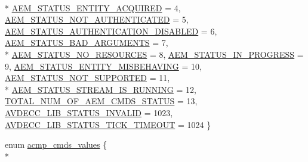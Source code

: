 \begin{DoxyCompactItemize}
\\*
\hyperlink{namespaceavdecc__lib_affd436edb2cecd20cfd784a84f852b2bac29adbeb4681b7134713cb3339b25deb}{A\+E\+M\+\_\+\+S\+T\+A\+T\+U\+S\+\_\+\+E\+N\+T\+I\+T\+Y\+\_\+\+A\+C\+Q\+U\+I\+R\+ED} = 4, 
\hyperlink{namespaceavdecc__lib_affd436edb2cecd20cfd784a84f852b2baf7adc1da1d42de8b7dd6948c4f0007ea}{A\+E\+M\+\_\+\+S\+T\+A\+T\+U\+S\+\_\+\+N\+O\+T\+\_\+\+A\+U\+T\+H\+E\+N\+T\+I\+C\+A\+T\+ED} = 5, 
\hyperlink{namespaceavdecc__lib_affd436edb2cecd20cfd784a84f852b2ba340db3afdf0c9c2c6967240fd303b25f}{A\+E\+M\+\_\+\+S\+T\+A\+T\+U\+S\+\_\+\+A\+U\+T\+H\+E\+N\+T\+I\+C\+A\+T\+I\+O\+N\+\_\+\+D\+I\+S\+A\+B\+L\+ED} = 6, 
\hyperlink{namespaceavdecc__lib_affd436edb2cecd20cfd784a84f852b2ba5531896e514772280c48dde65165ffeb}{A\+E\+M\+\_\+\+S\+T\+A\+T\+U\+S\+\_\+\+B\+A\+D\+\_\+\+A\+R\+G\+U\+M\+E\+N\+TS} = 7, 
\\*
\hyperlink{namespaceavdecc__lib_affd436edb2cecd20cfd784a84f852b2ba2a7bc947e3260dd5f1648ff20b643c06}{A\+E\+M\+\_\+\+S\+T\+A\+T\+U\+S\+\_\+\+N\+O\+\_\+\+R\+E\+S\+O\+U\+R\+C\+ES} = 8, 
\hyperlink{namespaceavdecc__lib_affd436edb2cecd20cfd784a84f852b2bad181d45fa2899b885260eed6e86a350f}{A\+E\+M\+\_\+\+S\+T\+A\+T\+U\+S\+\_\+\+I\+N\+\_\+\+P\+R\+O\+G\+R\+E\+SS} = 9, 
\hyperlink{namespaceavdecc__lib_affd436edb2cecd20cfd784a84f852b2bafdedf6e0392b0ba7e66a450d39994f91}{A\+E\+M\+\_\+\+S\+T\+A\+T\+U\+S\+\_\+\+E\+N\+T\+I\+T\+Y\+\_\+\+M\+I\+S\+B\+E\+H\+A\+V\+I\+NG} = 10, 
\hyperlink{namespaceavdecc__lib_affd436edb2cecd20cfd784a84f852b2ba852239737bcf152bba47fe4b8af23958}{A\+E\+M\+\_\+\+S\+T\+A\+T\+U\+S\+\_\+\+N\+O\+T\+\_\+\+S\+U\+P\+P\+O\+R\+T\+ED} = 11, 
\\*
\hyperlink{namespaceavdecc__lib_affd436edb2cecd20cfd784a84f852b2ba65a700b3657bb245338ede0e1f4e866f}{A\+E\+M\+\_\+\+S\+T\+A\+T\+U\+S\+\_\+\+S\+T\+R\+E\+A\+M\+\_\+\+I\+S\+\_\+\+R\+U\+N\+N\+I\+NG} = 12, 
\hyperlink{namespaceavdecc__lib_affd436edb2cecd20cfd784a84f852b2bacaaaf405889712cabe5a10fc46bc32b7}{T\+O\+T\+A\+L\+\_\+\+N\+U\+M\+\_\+\+O\+F\+\_\+\+A\+E\+M\+\_\+\+C\+M\+D\+S\+\_\+\+S\+T\+A\+T\+US} = 13, 
\hyperlink{namespaceavdecc__lib_affd436edb2cecd20cfd784a84f852b2ba8a4a3486ee32871689aae7049d91ac0c}{A\+V\+D\+E\+C\+C\+\_\+\+L\+I\+B\+\_\+\+S\+T\+A\+T\+U\+S\+\_\+\+I\+N\+V\+A\+L\+ID} = 1023, 
\hyperlink{namespaceavdecc__lib_affd436edb2cecd20cfd784a84f852b2ba32ca2a87202e84d0727b3430e4cda056}{A\+V\+D\+E\+C\+C\+\_\+\+L\+I\+B\+\_\+\+S\+T\+A\+T\+U\+S\+\_\+\+T\+I\+C\+K\+\_\+\+T\+I\+M\+E\+O\+UT} = 1024
 \}
\item 
enum \hyperlink{namespaceavdecc__lib_a88737ea8b50ed2922581a6f86e0cfc9f}{acmp\+\_\+cmds\+\_\+values} \{ \\*

\end{DoxyCompactItemize}
